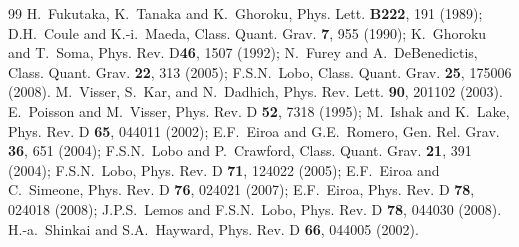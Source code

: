 \documentclass[aps,prd,twocolumn,eqsecnum,showpacs,amsmath]{revtex4}
\begin{document}
\begin{thebibliography}{99}
H.~Fukutaka, K.~Tanaka and K.~Ghoroku,
Phys. Lett. {\bf B222}, 191 (1989); 
D.H.~Coule and K.-i.~Maeda,
Class. Quant. Grav. {\bf 7}, 955 (1990); 
K.~Ghoroku and T.~Soma,
Phys. Rev. D{\bf 46}, 1507 (1992); 
N.~Furey and A.~DeBenedictis,
Class. Quant. Grav. {\bf 22}, 313 (2005); 
F.S.N.~Lobo,
Class. Quant. Grav. {\bf 25}, 175006 (2008).
M.~Visser, S.~Kar, and N.~Dadhich,
Phys. Rev. Lett. {\bf 90}, 201102 (2003).
E.~Poisson and M.~Visser,
Phys. Rev. D {\bf 52}, 7318 (1995);
M.~Ishak and K.~Lake,
Phys. Rev. D {\bf 65}, 044011 (2002);
E.F.~Eiroa and G.E.~Romero,
Gen. Rel. Grav. {\bf 36}, 651 (2004);
F.S.N.~Lobo and P.~Crawford,
Class. Quant. Grav. {\bf 21}, 391 (2004);
F.S.N.~Lobo,
Phys. Rev. D {\bf 71}, 124022 (2005);
E.F.~Eiroa and C.~Simeone,
Phys. Rev. D {\bf 76}, 024021 (2007);
E.F.~Eiroa,
Phys. Rev. D {\bf 78}, 024018 (2008);
J.P.S.~Lemos and F.S.N.~Lobo,
Phys. Rev. D {\bf 78}, 044030 (2008).
H.-a.~Shinkai and S.A.~Hayward,
Phys. Rev. D {\bf 66}, 044005 (2002).

\end{thebibliography}
\end{document}
